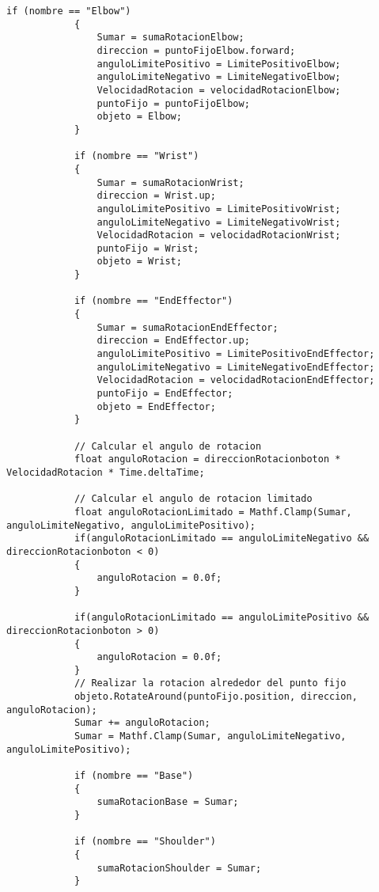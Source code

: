 \begin{lstlisting}[frame=single]
            if (nombre == "Elbow")
            {
                Sumar = sumaRotacionElbow;
                direccion = puntoFijoElbow.forward;
                anguloLimitePositivo = LimitePositivoElbow;
                anguloLimiteNegativo = LimiteNegativoElbow;
                VelocidadRotacion = velocidadRotacionElbow;
                puntoFijo = puntoFijoElbow;
                objeto = Elbow;
            }
    
            if (nombre == "Wrist")
            {
                Sumar = sumaRotacionWrist;
                direccion = Wrist.up;
                anguloLimitePositivo = LimitePositivoWrist;
                anguloLimiteNegativo = LimiteNegativoWrist;
                VelocidadRotacion = velocidadRotacionWrist;
                puntoFijo = Wrist;
                objeto = Wrist;
            }
    
            if (nombre == "EndEffector")
            {
                Sumar = sumaRotacionEndEffector;
                direccion = EndEffector.up;
                anguloLimitePositivo = LimitePositivoEndEffector;
                anguloLimiteNegativo = LimiteNegativoEndEffector;
                VelocidadRotacion = velocidadRotacionEndEffector;
                puntoFijo = EndEffector;
                objeto = EndEffector;
            }
            
            // Calcular el angulo de rotacion
            float anguloRotacion = direccionRotacionboton * VelocidadRotacion * Time.deltaTime;
            
            // Calcular el angulo de rotacion limitado
            float anguloRotacionLimitado = Mathf.Clamp(Sumar, anguloLimiteNegativo, anguloLimitePositivo);
            if(anguloRotacionLimitado == anguloLimiteNegativo && direccionRotacionboton < 0)
            {
                anguloRotacion = 0.0f;
            }
    
            if(anguloRotacionLimitado == anguloLimitePositivo && direccionRotacionboton > 0)
            {
                anguloRotacion = 0.0f;
            }
            // Realizar la rotacion alrededor del punto fijo
            objeto.RotateAround(puntoFijo.position, direccion, anguloRotacion);
            Sumar += anguloRotacion;
            Sumar = Mathf.Clamp(Sumar, anguloLimiteNegativo, anguloLimitePositivo);
    
            if (nombre == "Base")
            {
                sumaRotacionBase = Sumar;
            }
    
            if (nombre == "Shoulder")
            {
                sumaRotacionShoulder = Sumar;
            }
    

\end{lstlisting}
